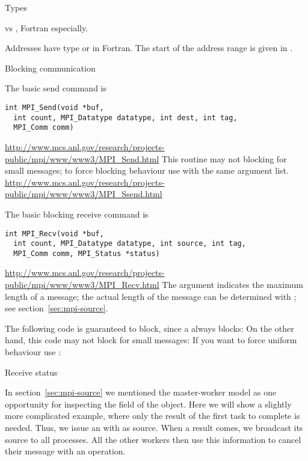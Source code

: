  {Types}

 vs , Fortran especially.

Addresses have type  or  in Fortran. The start of the address range is
given in .

 {Blocking communication}

The basic send command is
\begin{verbatim}
int MPI_Send(void *buf, 
  int count, MPI_Datatype datatype, int dest, int tag,
  MPI_Comm comm)
\end{verbatim}
\url{http://www.mcs.anl.gov/research/projects-public/mpi/www/www3/MPI_Send.html}
This routine may not blocking for small messages; to force blocking
behaviour use  with the same argument list.
\url{http://www.mcs.anl.gov/research/projects-public/mpi/www/www3/MPI_Ssend.html}

The basic blocking receive command is
\begin{verbatim}
int MPI_Recv(void *buf, 
  int count, MPI_Datatype datatype, int source, int tag,
  MPI_Comm comm, MPI_Status *status)
\end{verbatim}
\url{http://www.mcs.anl.gov/research/projects-public/mpi/www/www3/MPI_Recv.html}
The  argument indicates the maximum length of a message; the
actual length of the message can be determined with ; 
see section~\ref{sec:mpi-source}.

The following code is guaranteed to block, since a 
always blocks:
On the other hand, this code may not block for small messages:
If you want to force uniform behaviour use :

 {Receive status}

In section~\ref{sec:mpi-source} we mentioned the master-worker model
as one opportunity for inspecting the  field
of the  object. Here we will show a slightly
more complicated example, where only the result of the first task to
complete is needed. Thus, we issue an 
with  as source.  When a result comes, we
broadcast its source to all processes.  All the other workers then use
this information to cancel their message with
an  operation.

